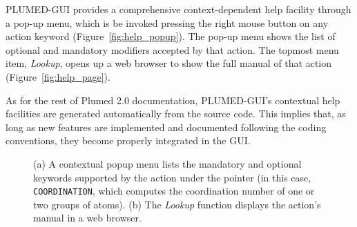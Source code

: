 \documentclass[preprint,12pt]{elsarticle}
\begin{document}

PLUMED-GUI provides a comprehensive context-dependent help facility
through a pop-up menu, which is be invoked pressing the right mouse
button on any action keyword (Figure~\ref{fig:help_popup}). The pop-up
menu shows the list of optional and mandatory modifiers accepted
by that action.  The topmost menu item, \emph{Lookup}, opens up a web
browser to show the full manual of that action
(Figure~\ref{fig:help_page}).

As for the rest of Plumed 2.0 documentation, PLUMED-GUI's contextual
help facilities are generated automatically from the source code. This
implies that, as long as new features are implemented and documented
following the coding conventions, they become properly integrated in
the GUI.



\begin{figure}
  \centering
  \caption{(a) A contextual popup menu lists the mandatory and
    optional keywords supported by the action under the pointer (in
    this case, \texttt{COORDINATION}, which computes the coordination
    number of one or two groups of atoms). (b) The \emph{Lookup} function
    displays the action's manual in a web browser. }
  \label{fig:help}
\end{figure}
\end{document}
